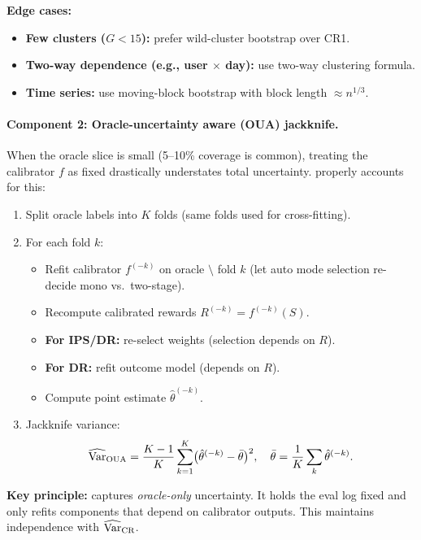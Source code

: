 \textbf{Edge cases:}
\begin{itemize}
\item \textbf{Few clusters ($G < 15$):} prefer wild-cluster bootstrap over CR1.
\item \textbf{Two-way dependence (e.g., user $\times$ day):} use two-way clustering formula.
\item \textbf{Time series:} use moving-block bootstrap with block length $\approx n^{1/3}$.
\end{itemize}

\paragraph{Component 2: Oracle-uncertainty aware (OUA) jackknife.}

When the oracle slice is small (5--10\% coverage is common), treating the calibrator $f$ as fixed drastically understates total uncertainty. \oua{} properly accounts for this:

\begin{enumerate}
\item Split oracle labels into $K$ folds (same folds used for cross-fitting).
\item For each fold $k$:
\begin{itemize}
\item Refit calibrator $f^{(-k)}$ on oracle $\setminus$ fold $k$ (let auto mode selection re-decide mono vs.\ two-stage).
\item Recompute calibrated rewards $R^{(-k)} = f^{(-k)}(S)$.
\item \textbf{For IPS/DR:} re-select \simcal{} weights (selection depends on $R$).
\item \textbf{For DR:} refit outcome model (depends on $R$).
\item Compute point estimate $\hat{\theta}^{(-k)}$.
\end{itemize}
\item Jackknife variance:
\begin{equation}
\widehat{\operatorname{Var}}_{\text{OUA}} = \frac{K-1}{K} \sum_{k=1}^K \bigl(\hat{\theta}^{(-k)} - \bar{\theta}\bigr)^2, \quad \bar{\theta} = \frac{1}{K}\sum_k \hat{\theta}^{(-k)}.
\end{equation}
\end{enumerate}

\textbf{Key principle:} \oua{} captures \emph{oracle-only} uncertainty. It holds the eval log fixed and only refits components that depend on calibrator outputs. This maintains independence with $\widehat{\operatorname{Var}}_{\text{CR}}$.

